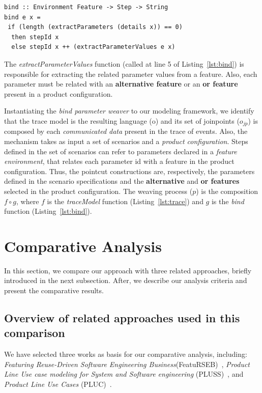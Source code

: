 \documentclass{llncs}
\begin{document}
\begin{lstlisting}[belowskip=10pt,frame=tb,caption={The \emph{bind waver} function},label=lst:bind]
bind :: Environment Feature -> Step -> String
bind e x =
 if (length (extractParameters (details x)) == 0)
  then stepId x
  else stepId x ++ (extractParameterValues e x)
\end{lstlisting}

The \emph{extractParameterValues} function (called at line 5 of
Listing~\ref{lst:bind}) is responsible for extracting the related
parameter values from a feature. Also, each parameter must be
related with an {\bf alternative feature} or an {\bf or feature}
present in a product configuration.

Instantiating the \emph{bind parameter weaver} to our
modeling framework, we identify that the trace model is the
resulting language (o) and its set of joinpoints ($o_{jp}$) is
composed by each \emph{communicated data} present in the trace of
events. Also, the mechanism takes as input a set of scenarios and a
\emph{product configuration}.
Steps defined in the set of scenarios can refer to parameters
declared in a \emph{feature environment}, that relates each
parameter id with a feature in the product configuration. Thus, the
pointcut constructions are, respectively, the
parameters defined in the scenario specifications and the {\bf
alternative} and {\bf or features} selected in the product
configuration. The weaving process ($p$) is the composition $f \circ
g$, where $f$ is the \emph{traceModel} function
(Listing~\ref{lst:trace}) and $g$ is the \emph{bind} function
(Listing~\ref{lst:bind}).

\section{Comparative Analysis}\label{sec:analysis}

In this section, we compare our approach with three related approaches,
briefly introduced in the next subsection. After, we describe our
analysis criteria and present the comparative results.

\subsection{Overview of related approaches used in this comparison}

We have selected three works as basis for our comparative analysis,
including: \emph{Featuring Reuse-Driven Software Engineering
Business}(FeatuRSEB)~\cite{griss-icsr-1998}, \emph{Product Line Use
case modeling for System and Software engineering}
(PLUSS)~\cite{eriksson-splc-2005}, and \emph{Product Line Use Cases}
(PLUC)~\cite{bertolino-esec-2003}. 
\end{document}
